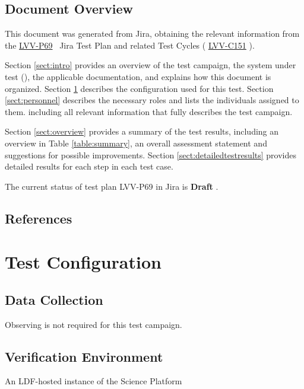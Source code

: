 \documentclass[DM,lsstdraft,STR,toc]{lsstdoc}
\begin{document}
\subsection{Document Overview}
\label{sect:docoverview}

This document was generated from Jira, obtaining the relevant information from the 
\href{https://jira.lsstcorp.org/secure/Tests.jspa#/testPlan/LVV-P69}{LVV-P69}
~Jira Test Plan and related Test Cycles (
  \href{https://jira.lsstcorp.org/secure/Tests.jspa#/testCycle/LVV-C151}{LVV-C151}
).

Section \ref{sect:intro} provides an overview of the test campaign, the system under test (\product{}),
the applicable documentation, and explains how this document is organized.
Section \ref{sect:configuration}  describes the configuration used for this test.
Section \ref{sect:personnel} describes the necessary roles and lists the individuals assigned to them.
including all relevant information that fully describes the test campaign.

Section \ref{sect:overview} provides a summary of the test results, including an overview in Table \ref{table:summary},
an overall assessment statement and suggestions for possible improvements.
Section \ref{sect:detailedtestresults} provides detailed results for each step in each test case.

The current status of test plan LVV-P69 in Jira is \textbf{ Draft }.

\subsection{References}
\label{sect:references}
\renewcommand{\refname}{}

\section{Test Configuration}
\label{sect:configuration}

\subsection{Data Collection}

  Observing is not required for this test campaign.

\subsection{Verification Environment}
\label{sect:hwconf}
  An LDF-hosted instance of the Science Platform
\end{document}

